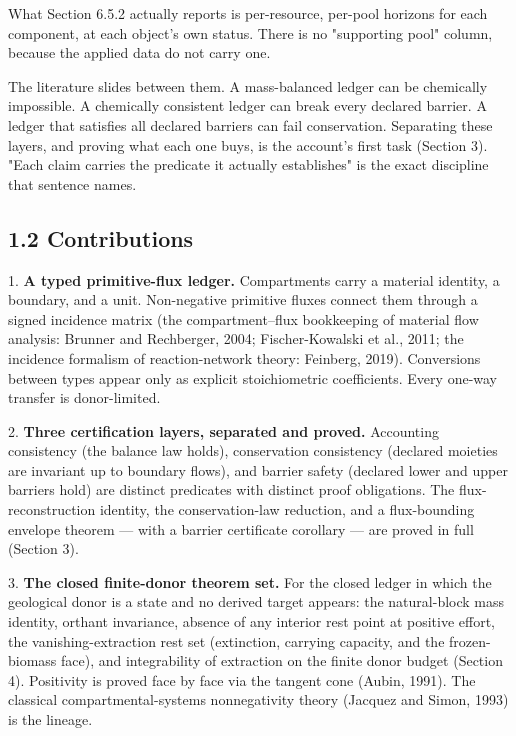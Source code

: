 \documentclass[11pt]{article}
\begin{document}
What Section 6.5.2 actually reports is per-resource, per-pool horizons for each component, at each object's own status. There is no "supporting pool" column, because the applied data do not carry one.

The literature slides between them. A mass-balanced ledger can be chemically impossible. A chemically consistent ledger can break every declared barrier. A ledger that satisfies all declared barriers can fail conservation. Separating these layers, and proving what each one buys, is the account's first task (Section 3). "Each claim carries the predicate it actually establishes" is the exact discipline that sentence names.

\subsection*{1.2 Contributions}\label{12-contributions}

1. \textbf{A typed primitive-flux ledger.} Compartments carry a material identity, a boundary, and a unit. Non-negative primitive fluxes connect them through a signed incidence matrix (the compartment--flux bookkeeping of material flow analysis: Brunner and Rechberger, 2004; Fischer-Kowalski et al., 2011; the incidence formalism of reaction-network theory: Feinberg, 2019). Conversions between types appear only as explicit stoichiometric coefficients. Every one-way transfer is donor-limited.

2. \textbf{Three certification layers, separated and proved.} Accounting consistency (the balance law holds), conservation consistency (declared moieties are invariant up to boundary flows), and barrier safety (declared lower and upper barriers hold) are distinct predicates with distinct proof obligations. The flux-reconstruction identity, the conservation-law reduction, and a flux-bounding envelope theorem --- with a barrier certificate corollary --- are proved in full (Section 3).

3. \textbf{The closed finite-donor theorem set.} For the closed ledger in which the geological donor is a state and no derived target appears: the natural-block mass identity, orthant invariance, absence of any interior rest point at positive effort, the vanishing-extraction rest set (extinction, carrying capacity, and the frozen-biomass face), and integrability of extraction on the finite donor budget (Section 4). Positivity is proved face by face via the tangent cone (Aubin, 1991). The classical compartmental-systems nonnegativity theory (Jacquez and Simon, 1993) is the lineage.
\end{document}
